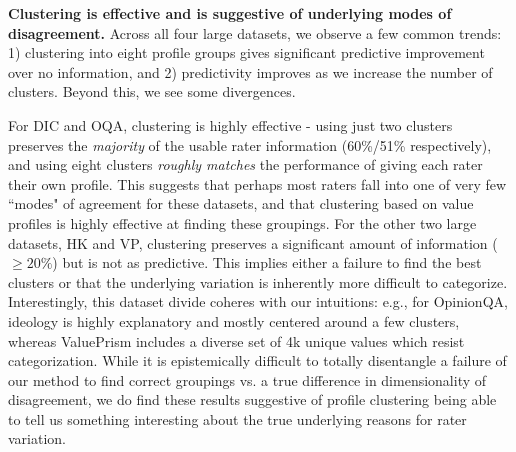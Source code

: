 \documentclass[11pt]{article}
\begin{document}
\textbf{Clustering is effective and is suggestive of underlying modes of disagreement.}
Across all four large datasets, we observe a few common trends: 1) clustering into eight profile groups gives significant predictive improvement over no information, and 2) predictivity improves as we increase the number of clusters. Beyond this, we see some divergences.

For DIC and OQA, clustering is highly effective - using just two clusters preserves the \textit{majority} of the usable rater information (60\%/51\% respectively), and using eight clusters \textit{roughly matches} the performance of giving each rater their own profile. This suggests that perhaps most raters fall into one of very few ``modes" of agreement for these datasets, and that clustering based on value profiles is highly effective at finding these groupings.
For the other two large datasets, HK and VP, clustering preserves a significant amount of information ($\geq20\%$) but is not as predictive.
This implies either a failure to find the best clusters or that the underlying variation is inherently more difficult to categorize. Interestingly, this dataset divide coheres with our intuitions: e.g., for OpinionQA, ideology is highly explanatory and mostly centered around a few clusters, whereas ValuePrism includes a diverse set of 4k unique values which resist categorization. While it is epistemically difficult to totally disentangle a failure of our method to find correct groupings vs. a true difference in dimensionality of disagreement, we do find these results suggestive of profile clustering being able to tell us something interesting about the true underlying reasons for rater variation.
\end{document}
